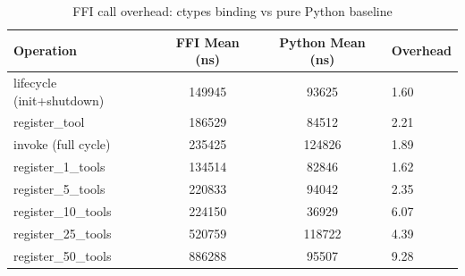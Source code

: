 \begin{table}[t]
\centering
\caption{FFI call overhead: ctypes binding vs pure Python baseline}
\label{tab:ffi-overhead}
\begin{tabular}{l S[table-format=6.0] S[table-format=6.0] l}
\toprule
Operation & {FFI Mean (ns)} & {Python Mean (ns)} & {Overhead} \\
\midrule
lifecycle (init+shutdown) & 149945 & 93625 & 1.60 \\
register\_tool & 186529 & 84512 & 2.21 \\
invoke (full cycle) & 235425 & 124826 & 1.89 \\
\midrule
register\_1\_tools & 134514 & 82846 & 1.62 \\
register\_5\_tools & 220833 & 94042 & 2.35 \\
register\_10\_tools & 224150 & 36929 & 6.07 \\
register\_25\_tools & 520759 & 118722 & 4.39 \\
register\_50\_tools & 886288 & 95507 & 9.28 \\
\bottomrule
\end{tabular}
\end{table}